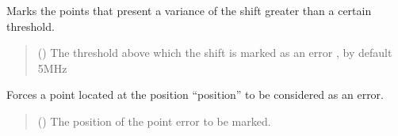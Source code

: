 \documentclass[letterpaper,10pt,english]{sphinxmanual}
\begin{document}
\begin{fulllineitems}
\begin{fulllineitems}
\begin{quote}
\begin{description}
\end{description}\end{quote}

\end{fulllineitems}


\begin{fulllineitems}
\label{\detokenize{source/_autosummary/HDF5_BLS_treat.Treat:HDF5_BLS_treat.Treat.mark_errors_std_shift}}
\pysigstartsignatures
\pysiglinewithargsret
{}
{}
{}
\pysigstopsignatures
\sphinxAtStartPar
Marks the points that present a variance of the shift greater than a certain threshold.
\begin{quote}\begin{description}
\sphinxAtStartPar
{} (\sphinxstyleliteralemphasis{\sphinxupquote{, }}) \textendash{} The threshold above which the shift is marked as an error , by default 5MHz

\end{description}\end{quote}

\end{fulllineitems}


\begin{fulllineitems}
\label{\detokenize{source/_autosummary/HDF5_BLS_treat.Treat:HDF5_BLS_treat.Treat.mark_point_error}}
\pysigstartsignatures
\pysiglinewithargsret
{}
{}
{}
\pysigstopsignatures
\sphinxAtStartPar
Forces a point located at the position “position” to be considered as an error.
\begin{quote}\begin{description}
\sphinxAtStartPar
{} () \textendash{} The position of the point error to be marked.


\end{description}
\end{quote}
\end{fulllineitems}
\end{fulllineitems}
\end{document}
